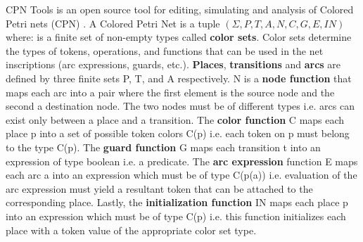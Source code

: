 CPN Tools \cite{CPNTools} is an open source tool for editing, simulating and analysis of Colored Petri nets (CPN) \cite{CPN}. A Colored Petri Net is a tuple $(\Sigma, P, T, A, N, C, G, E, IN)$ where: \Sigma is a finite set of non-empty types called \textbf{color sets}. Color sets determine the types of tokens, operations, and functions that can be used in the net inscriptions (arc expressions, guards, etc.). \textbf{Places}, \textbf{transitions} and \textbf{arcs} are defined by three finite sets P, T, and A respectively. N is a \textbf{node function} that maps each arc into a pair where the first element is the source node and the second a destination node. The two nodes must be of different types i.e. arcs can exist only between a place and a transition. The \textbf{color function} C maps each place p into a set of possible token colors C(p) i.e. each token on p must belong to the type C(p). The \textbf{guard function} G maps each transition t into an expression of type boolean i.e. a predicate. The \textbf{arc expression} function E maps each arc a into an expression which must be of type C(p(a)) i.e. evaluation of the arc expression must yield a resultant token that can be attached to the corresponding place. Lastly, the \textbf{initialization function} IN maps each place p into an expression which must be of type C(p) i.e. this function initializes each place with a token value of the appropriate color set type. 

